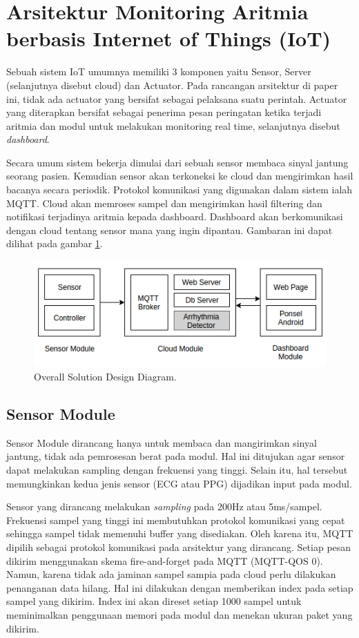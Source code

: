 \documentclass[]{indojc}
\begin{document}
\section{Arsitektur Monitoring Aritmia berbasis Internet of Things (IoT)} \label{section:bab2}
Sebuah sistem IoT umumnya memiliki 3 komponen yaitu Sensor, Server (selanjutnya disebut cloud) dan Actuator. Pada rancangan arsitektur di paper ini, tidak ada actuator yang bersifat sebagai pelaksana suatu perintah. Actuator yang diterapkan bersifat sebagai penerima pesan peringatan ketika terjadi aritmia dan modul untuk melakukan monitoring real time, selanjutnya disebut \textit{dashboard}.

Secara umum sistem bekerja dimulai dari sebuah sensor membaca sinyal jantung seorang pasien. Kemudian sensor akan terkoneksi ke cloud dan mengirimkan hasil bacanya secara periodik. Protokol komunikasi yang digunakan dalam sistem ialah MQTT. Cloud akan memroses sampel dan mengirimkan hasil filtering dan notifikasi terjadinya aritmia kepada dashboard. Dashboard akan berkomunikasi dengan cloud tentang sensor mana yang ingin dipantau. Gambaran ini dapat dilihat pada gambar \ref{fig:overall_diagram}.

\begin{figure}[htbp]
\centerline{\includegraphics[scale=0.65]{images/overall.png}}
\caption{Overall Solution Design Diagram.}
\label{fig:overall_diagram}
\end{figure}

\subsection{Sensor Module}
Sensor Module dirancang hanya untuk membaca dan mangirimkan sinyal jantung, tidak ada pemrosesan berat pada modul. Hal ini ditujukan agar sensor dapat melakukan sampling dengan frekuensi yang tinggi. Selain itu, hal tersebut memungkinkan kedua jenis sensor (ECG atau PPG) dijadikan input pada modul. 

Sensor yang dirancang melakukan \textit{sampling} pada 200Hz atau 5ms/sampel. Frekuensi sampel yang tinggi ini membutuhkan protokol komunikasi yang cepat sehingga sampel tidak memenuhi buffer yang disediakan. Oleh karena itu, MQTT dipilih sebagai protokol komunikasi pada arsitektur yang dirancang. Setiap pesan dikirim menggunakan skema fire-and-forget pada MQTT (MQTT-QOS 0). Namun, karena tidak ada jaminan sampel sampia pada cloud perlu dilakukan penanganan data hilang. Hal ini dilakukan dengan memberikan index pada setiap sampel yang dikirim. Index ini akan direset setiap 1000 sampel untuk meminimalkan penggunaan memori pada modul dan menekan ukuran paket yang dikirim.
\end{document}
